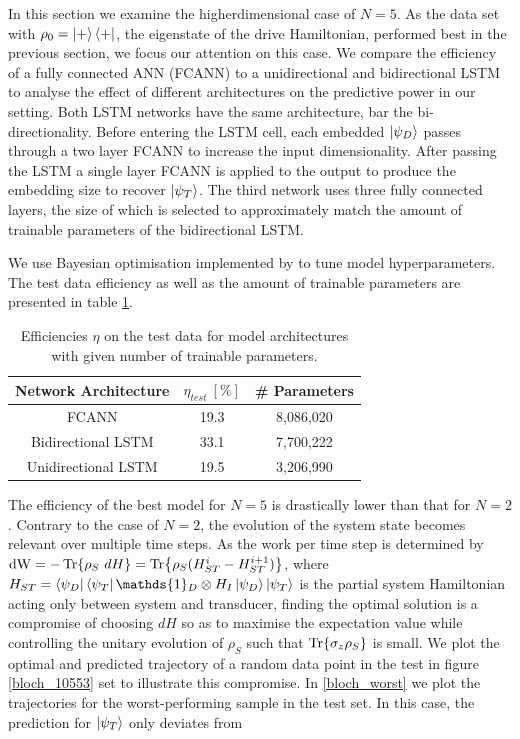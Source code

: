 In this section we examine the higherdimensional case of $N=5$.
As the data set with $\rho_0 = \ket{+} \bra{+}$, the eigenstate of the drive Hamiltonian, performed best in the previous section, we focus our attention on this case.
We compare the efficiency of a fully connected ANN (FCANN) to a unidirectional and bidirectional LSTM to analyse the effect of different architectures on the predictive power in our setting.
Both LSTM networks have the same architecture, bar the bi-directionality.
Before entering the LSTM cell, each embedded $\ket{\psi_D}$ passes through a two layer FCANN to increase the input dimensionality. 
After passing the LSTM a single layer FCANN is applied to the output to produce the embedding size to recover $\ket{\psi_T}$.
The third network uses three fully connected layers, the size of which is selected to approximately match the amount of trainable parameters of the bidirectional LSTM.

We use Bayesian optimisation implemented by \cite{wandb} to tune model hyperparameters.
The test data efficiency as well as the amount of trainable parameters are presented in table \ref{n5efftable}.

\begin{table}[h]
	\centering
	\begin{tabular}{ c | c | c}
		Network Architecture & $\eta_{test} \ [\%]$  & \# Parameters \\
		\hline
		FCANN & 19.3 & 8,086,020 \\
		Bidirectional LSTM & 33.1 & 7,700,222 \\
		Unidirectional LSTM & 19.5 & 3,206,990\\
	\end{tabular}
	\caption{Efficiencies $\eta$ on the test data for model architectures with given number of trainable parameters.}
	\label{n5efftable}
\end{table}

The efficiency of the best model for $N=5$ is drastically lower than that for $N=2$.
Contrary to the case of $N=2$, the evolution of the system state becomes relevant over multiple time steps.
As the work per time step is determined by $\mathrm{dW} = -\Tr{\rho_S \ dH} = \Tr{\rho_S (H_{ST}^i - H_{ST}^{i+1})}$, where $H_{ST} = \bra{\psi_D}\bra{\psi_T} \mathds{1}_D \otimes H_I \ket{\psi_D} \ket{\psi_T}$ is the partial system Hamiltonian acting only between system and transducer, finding the optimal solution is a compromise of choosing $dH$ so as to maximise the expectation value while controlling the unitary evolution of $\rho_S$ such that $\Tr{\sigma_z \rho_S}$ is small.
We plot the optimal and predicted trajectory of a random data point in the test in figure \ref{bloch_10553} set to illustrate this compromise.
In \ref{bloch_worst} we plot the trajectories for the worst-performing sample in the test set.
In this case, the prediction for $\ket{\psi_T}$ only deviates from 

